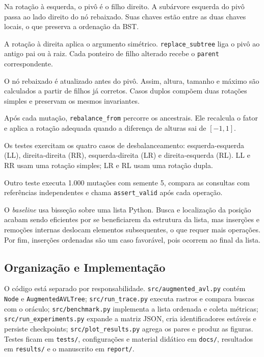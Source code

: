\documentclass[12pt]{article}
\begin{document}
{Na rotação à esquerda, o pivô é o filho direito. A subárvore esquerda do pivô passa ao lado direito do nó rebaixado. Suas chaves estão entre as duas chaves locais, o que preserva a ordenação da BST.}

{A rotação à direita aplica o argumento simétrico. \texttt{replace\_subtree} liga o pivô ao antigo pai ou à raiz. Cada ponteiro de filho alterado recebe o \texttt{parent} correspondente.}

{O nó rebaixado é atualizado antes do pivô. Assim, altura, tamanho e máximo são calculados a partir de filhos já corretos. Casos duplos compõem duas rotações simples e preservam os mesmos invariantes.}

{Após cada mutação, \texttt{rebalance\_from} percorre os ancestrais. Ele recalcula o fator e aplica a rotação adequada quando a diferença de alturas sai de $[-1,1]$.}

{Os testes exercitam os quatro casos de desbalanceamento: esquerda-esquerda (LL), direita-direita (RR), esquerda-direita (LR) e direita-esquerda (RL). LL e RR usam uma rotação simples; LR e RL usam uma rotação dupla.}

{Outro teste executa 1.000 mutações com semente 5, compara as consultas com referências independentes e chama \texttt{assert\_valid} após cada operação.}

{O \textit{baseline} usa bisseção sobre uma lista Python. Busca e localização da posição acabam sendo eficientes por se beneficiarem da estrutura da lista, mas inserções e remoções internas deslocam elementos subsequentes, o que requer mais operações. Por fim, inserções ordenadas são um caso favorável, pois ocorrem ao final da lista.}

\subsection{{Organização e Implementação}}\label{sec:implementation:organization}

{O código está separado por responsabilidade. \texttt{src/augmented\_avl.py} contém \texttt{Node} e \texttt{AugmentedAVLTree}; \texttt{src/run\_trace.py} executa rastros e compara buscas com o oráculo; \texttt{src/benchmark.py} implementa a lista ordenada e coleta métricas; \texttt{src/run\_experiments.py} expande a matriz JSON, cria identificadores estáveis e persiste checkpoints; \texttt{src/plot\_results.py} agrega os pares e produz as figuras. Testes ficam em \texttt{tests/}, configurações e material didático em \texttt{docs/}, resultados em \texttt{results/} e o manuscrito em \texttt{report/}.}
\end{document}

